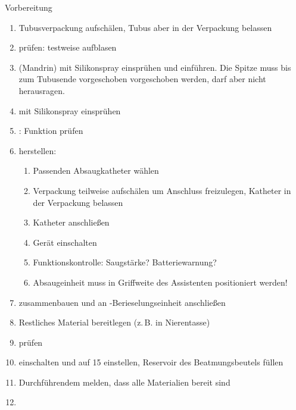 \documentclass[
ngerman,
paper=a4,
asymmetric,
fontsize=8pt,
draft=false,
numbers=noenddot,
bibtotocnumbered,
footnotes=multiple,
toc=flat,
]{scrbook}
\begin{document}
\begin{ProcedureStepsWide}{Vorbereitung}
\begin{enumerate}
  Ebenso müssen alle möglicherweise benötigten Spatel
  (zumindest $\pm$ 1 Größe und die entsprechenden
  gebogenen bzw. geraden Spatel) mit dem
  vorhandenen Laryngoskopgriff geprüft werden (Lichtquelle
  bei Warmlichtgeräten, passende Verbindung bei Kaltlichtgeräten)
  \item Tubusverpackung aufschälen, Tubus aber in der Verpackung belassen
  \item {} prüfen: test\-weise aufblasen
  \item {} (Mandrin) mit Silikonspray
  einsprühen und
  einführen. Die Spitze muss bis zum Tubusende vorgeschoben vorgeschoben
  werden, darf aber nicht herausragen.
  \item {} mit Silikonspray einsprühen
  \item {}: Funktion prüfen
  \item {} herstellen:
  \begin{enumerate}
    \item Passenden Absaugkatheter wählen
    \item Verpackung teilweise aufschälen um Anschluss
    freizulegen, Katheter in der Verpackung belassen
    \item Katheter anschließen
    \item Gerät einschalten
    \item Funktionskontrolle: Saugstärke?
    Batteriewarnung?
    \item Absaugeinheit muss in Griff\-weite des Assistenten
    positioniert werden!
  \end{enumerate}
  \item {} zusammenbauen und an
  -Berieselungseinheit anschließen
  \item Restliches Material bereitlegen (z.\,B. in Nierentasse)
  \item {} prüfen
  \item {} einschalten und auf
  15{\LPerMin*} einstellen, Reservoir des Beatmungsbeutels
  füllen
  \item Durchführendem melden, dass alle Materialien bereit sind
  \item {}
\end{enumerate}
\end{ProcedureStepsWide}
\end{document}
